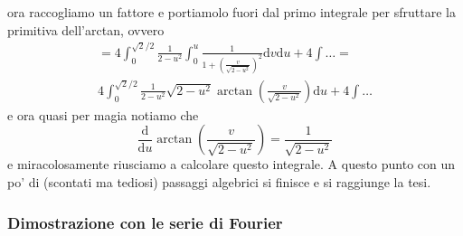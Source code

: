 \documentclass[11pt]{scrartcl}
\begin{document}
  ora raccogliamo un fattore e portiamolo fuori dal primo integrale per sfruttare la primitiva dell'arctan, ovvero
  \begin{align*}
  	=4\int_0^{\sqrt{2}/2}\frac{1}{2-u^2}\int_0^u\frac{1}{1+\left(\frac{v}{\sqrt{2-u^2}}\right)^2}\text{d}v\text{d}u+4\int \dots =\\
  	4\int_0^{\sqrt{2}/2}\frac{1}{2-u^2}\sqrt{2-u^2}\arctan\left(\frac{v}{\sqrt{2-u^2}}\right)\text{d}u+4\int\dots
  \end{align*}
  e ora quasi per magia notiamo che 
  $$\frac{\text{d}}{\text{d}u}\arctan\left(\frac{v}{\sqrt{2-u^2}}\right)=\frac{1}{\sqrt{2-u^2}}$$
  e miracolosamente riusciamo a calcolare questo integrale. A questo punto con un po' di (scontati ma tediosi) passaggi algebrici si finisce e si raggiunge la tesi.
  
  \subsubsection{Dimostrazione con le serie di Fourier}
  
\end{document}
